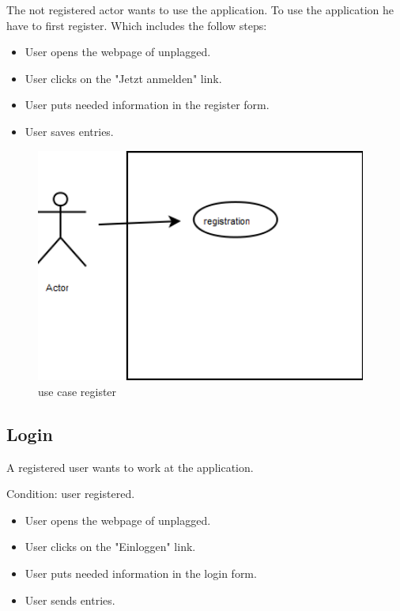 The not registered actor wants to use the application. To use the application he have to first register. Which includes 
the follow steps:


\begin{itemize}
\item User opens the webpage of unplagged.
\item User clicks on the "Jetzt anmelden" link.
\item User puts needed information in the register form.
\item User saves entries.
\end{itemize}

\begin{figure}[!ht]
  \centering
    \includegraphics[width=0.97\textwidth]{images/use_cases/registration.png}
  \caption{use case register}
  \label{fig:use case register}
\end{figure}

\subsection{Login}

A registered user wants to work at the application.

Condition: user registered.

\begin{itemize}
\item User opens the webpage of unplagged.
\item User clicks on the "Einloggen" link.
\item User puts needed information in the login form.
\item User sends entries.
\end{itemize}


